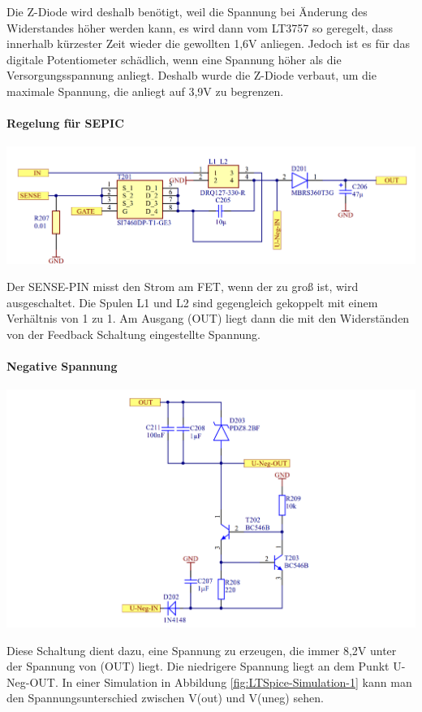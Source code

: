 \documentclass[paper=a4, 12pt]{scrreprt}
\begin{document}
			Die Z-Diode wird deshalb benötigt, weil die Spannung bei Änderung des Widerstandes höher werden kann, es wird dann vom LT3757 so geregelt, dass innerhalb kürzester Zeit wieder die gewollten 1,6V anliegen. Jedoch ist es für das digitale Potentiometer schädlich, wenn eine Spannung höher als die Versorgungsspannung anliegt. Deshalb wurde die Z-Diode verbaut, um die maximale Spannung, die anliegt auf 3,9V zu begrenzen.
			\paragraph{Regelung für SEPIC}\hfill \break
			\begin{adjustbox}{center,caption={Regelungsschaltung für LT3757},label={fig:regelung},nofloat=figure,vspace=\bigskipamount}
				\includegraphics[width=\textwidth]{img/Regelung_SEPIC.PNG}
			\end{adjustbox}
			Der SENSE-PIN misst den Strom am FET, wenn der zu groß ist, wird ausgeschaltet. Die Spulen L1 und L2 sind gegengleich gekoppelt mit einem Verhältnis von 1 zu 1. Am Ausgang (OUT) liegt dann die mit den Widerständen von der Feedback Schaltung eingestellte Spannung.
			\pagebreak
			\paragraph{Negative Spannung}\hfill \break
			\begin{adjustbox}{center,caption={Schaltung für Versorgung von OPV der Stromquelle},label={fig:neg-spg},nofloat=figure,vspace=\bigskipamount}
				\includegraphics[width=\textwidth]{img/Negative_Spannung.PNG}
			\end{adjustbox}
			Diese Schaltung dient dazu, eine Spannung zu erzeugen, die immer 8,2V unter der Spannung von (OUT) liegt. Die niedrigere Spannung liegt an dem Punkt U-Neg-OUT. In einer Simulation in Abbildung \ref{fig:LTSpice-Simulation-1} kann man den Spannungsunterschied zwischen V(out) und V(uneg) sehen.
			\newpage
\end{document}
